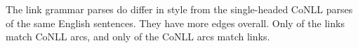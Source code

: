 \documentclass[11pt]{article}
\newcommand{\Note}[4][]{\todo[author=#2,color=#3,fancyline,#1]{#4}}
\newcommand{\noteJE}[2][]{\Note[#1]{JE}{green!40}{#2}}
\newcommand{\NoteJE}[2][]{\noteJE[inline,#1]{#2}}
\begin{document}
The link grammar parses do differ in style from the single-headed CoNLL parses of the same English sentences.  They have more edges overall.  Only of the links match CoNLL arcs, and only of the CoNLL arcs match links.
%   
% 







%  
\end{document}
